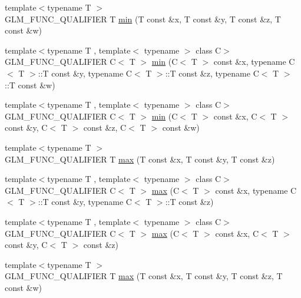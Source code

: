 \begin{DoxyCompactItemize}
\item 
{\footnotesize template$<$typename T $>$ }\\G\+L\+M\+\_\+\+F\+U\+N\+C\+\_\+\+Q\+U\+A\+L\+I\+F\+I\+ER T \hyperlink{group__gtx__extented__min__max_ga95466987024d03039607f09e69813d69}{min} (T const \&x, T const \&y, T const \&z, T const \&w)
\item 
{\footnotesize template$<$typename T , template$<$ typename $>$ class C$>$ }\\G\+L\+M\+\_\+\+F\+U\+N\+C\+\_\+\+Q\+U\+A\+L\+I\+F\+I\+ER C$<$ T $>$ \hyperlink{group__gtx__extented__min__max_ga4fe35dd31dd0c45693c9b60b830b8d47}{min} (C$<$ T $>$ const \&x, typename C$<$ T $>$\+::T const \&y, typename C$<$ T $>$\+::T const \&z, typename C$<$ T $>$\+::T const \&w)
\item 
{\footnotesize template$<$typename T , template$<$ typename $>$ class C$>$ }\\G\+L\+M\+\_\+\+F\+U\+N\+C\+\_\+\+Q\+U\+A\+L\+I\+F\+I\+ER C$<$ T $>$ \hyperlink{group__gtx__extented__min__max_ga7471ea4159eed8dd9ea4ac5d46c2fead}{min} (C$<$ T $>$ const \&x, C$<$ T $>$ const \&y, C$<$ T $>$ const \&z, C$<$ T $>$ const \&w)
\item 
{\footnotesize template$<$typename T $>$ }\\G\+L\+M\+\_\+\+F\+U\+N\+C\+\_\+\+Q\+U\+A\+L\+I\+F\+I\+ER T \hyperlink{group__gtx__extented__min__max_ga04991ccb9865c4c4e58488cfb209ce69}{max} (T const \&x, T const \&y, T const \&z)
\item 
{\footnotesize template$<$typename T , template$<$ typename $>$ class C$>$ }\\G\+L\+M\+\_\+\+F\+U\+N\+C\+\_\+\+Q\+U\+A\+L\+I\+F\+I\+ER C$<$ T $>$ \hyperlink{group__gtx__extented__min__max_gae1b7bbe5c91de4924835ea3e14530744}{max} (C$<$ T $>$ const \&x, typename C$<$ T $>$\+::T const \&y, typename C$<$ T $>$\+::T const \&z)
\item 
{\footnotesize template$<$typename T , template$<$ typename $>$ class C$>$ }\\G\+L\+M\+\_\+\+F\+U\+N\+C\+\_\+\+Q\+U\+A\+L\+I\+F\+I\+ER C$<$ T $>$ \hyperlink{group__gtx__extented__min__max_gaf832e9d4ab4826b2dda2fda25935a3a4}{max} (C$<$ T $>$ const \&x, C$<$ T $>$ const \&y, C$<$ T $>$ const \&z)
\item 
{\footnotesize template$<$typename T $>$ }\\G\+L\+M\+\_\+\+F\+U\+N\+C\+\_\+\+Q\+U\+A\+L\+I\+F\+I\+ER T \hyperlink{group__gtx__extented__min__max_ga78e04a0cef1c4863fcae1a2130500d87}{max} (T const \&x, T const \&y, T const \&z, T const \&w)

\end{DoxyCompactItemize}
